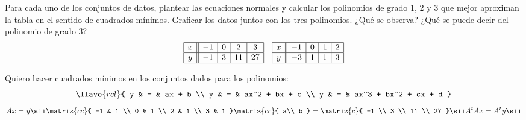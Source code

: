 \begin{enunciado}{\ejercicio}
  Para cada uno de los conjuntos de datos, plantear las ecuaciones normales y calcular los polinomios de grado 1, 2 y 3 que
  mejor aproximan la tabla en el sentido de cuadrados mínimos. Graficar los datos juntos con los tres polinomios.
  ¿Qué se observa? ¿Qué se puede decir del polinomio de grado 3?
  $$
    \begin{array}{|c||c|c|c|c|}
      \hline
      x & -1 & 0 & 2  & 3  \\ \hline
      y & -1 & 3 & 11 & 27 \\ \hline
    \end{array}
    \quad
    \begin{array}{|c||c|c|c|c|}
      \hline
      x & -1 & 0 & 1 & 2 \\ \hline
      y & -3 & 1 & 1 & 3 \\ \hline
    \end{array}
  $$
\end{enunciado}

Quiero hacer cuadrados mínimos en los conjuntos dados para los polinomios:
$$
  \llave{rcl}{
    y & = & ax + b  \\
    y & = & ax^2 + bx + c  \\
    y & = & ax^3 + bx^2 + cx + d
  }
$$
$$
  A x = y
  \sii
  \matriz{cc}{
    -1 & 1 \\
    0 & 1 \\
    2 & 1 \\
    3 & 1
  }
  \matriz{cc}{
    a\\
    b
  }
  =
  \matriz{c}{
    -1 \\
    3  \\
    11  \\
    27
  }
  \sii
  A^tAx = A^ty
  \sii
$$
